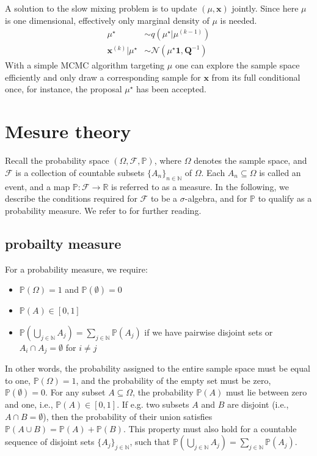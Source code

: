 A solution to the slow mixing problem is to update $(\mu, \bm{x})$ jointly.
Since here $\mu$ is one dimensional, effectively only marginal density of $\mu$ is needed.
\begin{align}
	\mu^{\star}  &\sim q (\mu^{\star}|	\mu^{(k-1)} ) \\
	\bm{x}^{(k)} | \mu^{\star} &\sim \mathcal{N} (	\mu^{\star}\bm{1}, \bm{Q}^{-1}) 
\end{align}
With a simple MCMC algorithm targeting  $ \mu$ one can explore the sample space efficiently and only draw a corresponding sample for $\bm{x}$ from its full conditional once, for instance, the proposal $\mu^{\star}$ has been accepted.

\chapter{Mesure theory}
\label{ch:Mesure}
Recall the probability space $(\Omega, \mathcal{F}, \mathbb{P})$, where $\Omega$ denotes the sample space, and $\mathcal{F}$ is a collection of countable subsets $\{ A_n \}_{n \in \mathbb{N}}$ of $\Omega$. Each $A_n \subseteq \Omega$ is called an event, and a map $\mathbb{P} : \mathcal{F} \rightarrow \mathbb{R}$ is referred to as a measure.
In the following, we describe the conditions required for $\mathcal{F}$ to be a $\sigma$-algebra, and for $\mathbb{P}$ to qualify as a probability measure.
We refer to \cite{lawler2016notes} \cite{kopp2004measintprob} for further reading.

\section{probailty measure}
For a probability measure, we require:
\begin{itemize}
	\item $\mathbb{P}(\Omega) = 1$ and $\mathbb{P}(\emptyset) = 0$
	\item $\mathbb{P}(A) \in [0,1]$
	\item $\mathbb{P}(\bigcup_{j \in \mathbb{N}} A_j )= \sum_{j \in \mathbb{N}}  \mathbb{P}(A_j)$ if we have pairwise disjoint sets or $A_i \cap A_j = \emptyset$ for $i \neq j $
\end{itemize}
In other words, the probability assigned to the entire sample space must be equal to one, $\mathbb{P}(\Omega) = 1$, and the probability of the empty set must be zero, $\mathbb{P}(\emptyset) = 0$. For any subset $A \subseteq \Omega$, the probability $\mathbb{P}(A)$ must lie between zero and one, i.e., $\mathbb{P}(A) \in [0,1]$.
If e.g. two subsets $A$ and $B$ are disjoint (i.e., $A \cap B = \emptyset$), then the probability of their union satisfies $\mathbb{P}(A \cup B) = \mathbb{P}(A) + \mathbb{P}(B)$.
This property must also hold for a countable sequence of disjoint sets $\{A_j\}_{j \in \mathbb{N}}$, such that $\mathbb{P}\left( \bigcup_{j \in \mathbb{N}} A_j \right) = \sum_{j \in \mathbb{N}} \mathbb{P}(A_j)$.

